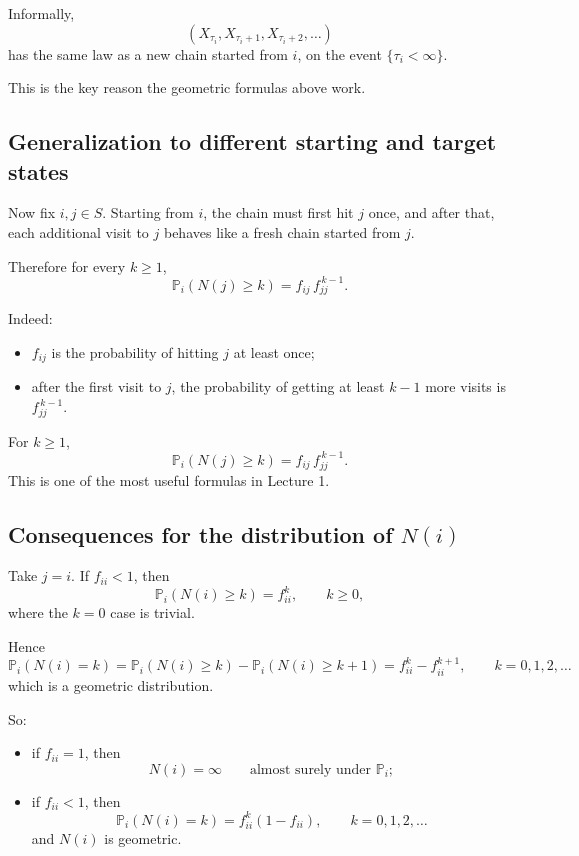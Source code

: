 \documentclass[11pt]{article}
\theoremstyle{definition}
\begin{document}
Informally,
\[
(X_{\tau_i},X_{\tau_i+1},X_{\tau_i+2},\dots)
\]
has the same law as a new chain started from \(i\), on the event \(\{\tau_i<\infty\}\).

This is the key reason the geometric formulas above work.

\subsection{Generalization to different starting and target states}

Now fix \(i,j\in S\). Starting from \(i\), the chain must first hit \(j\) once, and after that, each additional visit to \(j\) behaves like a fresh chain started from \(j\).

Therefore for every \(k\ge 1\),
\[
\mathbb P_i(N(j)\ge k)=f_{ij}\,f_{jj}^{\,k-1}.
\]

Indeed:
\begin{itemize}[leftmargin=2em]
    \item \(f_{ij}\) is the probability of hitting \(j\) at least once;
    \item after the first visit to \(j\), the probability of getting at least \(k-1\) more visits is \(f_{jj}^{\,k-1}\).
\end{itemize}

\begin{keyformula}
For \(k\ge 1\),
\[
\mathbb P_i(N(j)\ge k)=f_{ij}\,f_{jj}^{\,k-1}.
\]
This is one of the most useful formulas in Lecture 1.
\end{keyformula}

\subsection{Consequences for the distribution of \texorpdfstring{$N(i)$}{N(i)}}

Take \(j=i\). If \(f_{ii}<1\), then
\[
\mathbb P_i(N(i)\ge k)=f_{ii}^k,
\qquad k\ge 0,
\]
where the \(k=0\) case is trivial.

Hence
\[
\mathbb P_i(N(i)=k)
=
\mathbb P_i(N(i)\ge k)-\mathbb P_i(N(i)\ge k+1)
=
f_{ii}^k-f_{ii}^{k+1},
\qquad k=0,1,2,\dots
\]
which is a geometric distribution.

So:
\begin{itemize}[leftmargin=2em]
    \item if \(f_{ii}=1\), then
    \[
    N(i)=\infty
    \qquad \text{almost surely under } \mathbb P_i;
    \]
    \item if \(f_{ii}<1\), then
    \[
    \mathbb P_i(N(i)=k)=f_{ii}^k(1-f_{ii}),
    \qquad k=0,1,2,\dots
    \]
    and \(N(i)\) is geometric.
\end{itemize}
\end{document}
